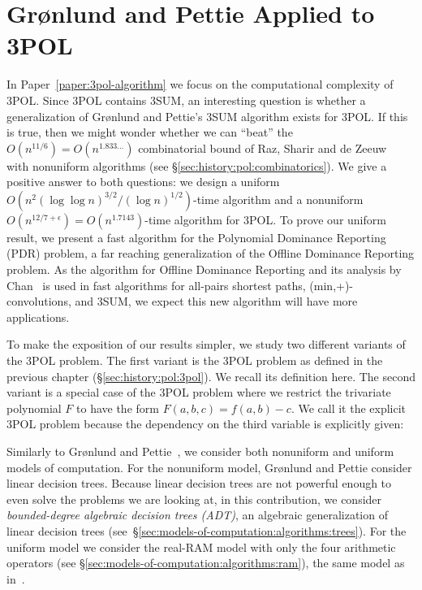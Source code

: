 \section{Gr\o nlund and Pettie Applied to 3POL}

In Paper~\ref{paper:3pol-algorithm}
we focus on the computational complexity of 3POL\@. Since 3POL contains 3SUM,
an interesting question is whether a generalization of Gr\o nlund and Pettie's
3SUM algorithm exists for 3POL\@. If this is true, then we might wonder whether
we can ``beat'' the $O(n^{11/6}) = O(n^{1.833\ldots})$ combinatorial bound of Raz,
Sharir and de Zeeuw~\cite{RSZ15} with nonuniform algorithms
(see \S\ref{sec:history:pol:combinatorics}).
%
We give a positive
answer to both questions: we design
a uniform
$O(n^2 {(\log \log n)}^{3/2} / {(\log n)}^{1/2})$-time
algorithm
and
a nonuniform
$O(n^{12/7+\epsilon}) = O(n^{1.7143})$-time algorithm
for 3POL\@.
%
To prove our uniform result, we present a fast algorithm for the Polynomial
Dominance Reporting (PDR) problem, a far reaching generalization of the
Offline Dominance Reporting problem.
%
As the algorithm for Offline Dominance Reporting and its
analysis by Chan~\cite{Cha08} is used in fast algorithms for all-pairs shortest
paths, (min,+)-convolutions, and 3SUM, we expect this new algorithm will have
more applications.

To make the exposition of our results simpler,
we study two different variants of the 3POL problem.
The first variant is the 3POL problem as defined in the previous chapter
(\S\ref{sec:history:pol:3pol}).
We recall its definition here.
\ProblemPOLImplicit*
The second variant is a special case of the 3POL problem where we
restrict the trivariate polynomial $F$ to have the form $F(a,b,c) = f(a,b) -
c$. We call it the explicit 3POL problem because the dependency on the third
variable is explicitly given:
%


Similarly to Gr\o nlund and Pettie~\cite{GP18}, we consider both nonuniform
and uniform models of computation.
%
For the nonuniform model, Gr\o nlund and Pettie consider linear
decision trees.
%
Because linear decision trees are not powerful enough to even solve the
problems we are looking at,
in this contribution, we consider
\emph{bounded-degree algebraic decision trees (ADT)},
an algebraic generalization of linear decision trees
(see~\S\ref{sec:models-of-computation:algorithms:trees}).
%
For the uniform model we consider the real-RAM model with only the four
arithmetic operators (see \S\ref{sec:models-of-computation:algorithms:ram}),
the same model as in~\cite{GP18}.

